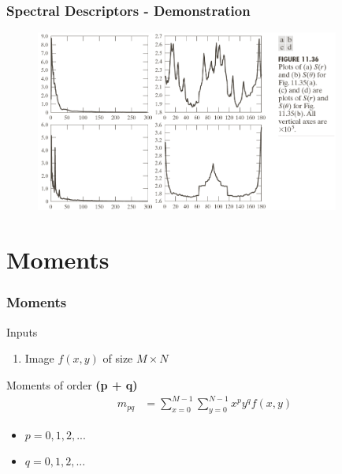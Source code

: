 \documentclass[english,11pt,table,handout]{beamer}
\begin{document}
\frame
{
	\frametitle{Spectral Descriptors - Demonstration}
	\begin{figure}[!h]
		\includegraphics[width=10cm]{spectral_2.png}
	\end{figure}
}

\section{Moments}
\frame
{
	\frametitle{Moments}
	\large
	\begin{block}{Inputs}
		\begin{enumerate}
			\item Image $f(x,y)$ of size $M \times N$
		\end{enumerate}
	\end{block}
	
	\begin{alertblock}{Moments of order \textbf{(p + q) }}
		\begin{equation}
		\begin{split}
		\nonumber
			m_{pq} &= \sum_{x = 0}^{M-1}{ \sum_{y = 0}^{N-1} {x^p y^q f(x,y)} } 
		\end{split}
		\end{equation}
		\begin{itemize}
			\item $p = 0, 1, 2, ...$
			\item $q = 0, 1, 2, ...$
		\end{itemize}
	\end{alertblock}
}
\end{document}
